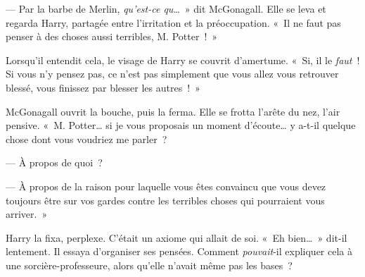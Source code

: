 --- Par la barbe de Merlin, \emph{qu'est-ce qu}…~» dit McGonagall. Elle se leva et regarda Harry, partagée entre l'irritation et la préoccupation.
«~Il ne faut pas penser à des choses aussi terribles, M. Potter~!~»

Lorsqu'il entendit cela, le visage de Harry se couvrit d'amertume.
«~Si, il le \emph{faut}~! Si vous n'y pensez pas, ce n'est pas simplement que vous allez vous retrouver blessé, vous finissez par blesser les autres~!~»

McGonagall ouvrit la bouche, puis la ferma. Elle se frotta l'arête du nez, l'air pensive.
«~M. Potter… si je vous proposais un moment d'écoute… y a-t-il quelque chose dont vous voudriez me parler~?

--- À propos de quoi~?

--- À propos de la raison pour laquelle vous êtes convaincu que vous devez toujours être sur vos gardes contre les terribles choses qui pourraient vous arriver.~»

Harry la fixa, perplexe. C'était un axiome qui allait de soi. «~Eh bien…~» dit-il lentement. Il essaya d'organiser ses pensées. Comment \emph{pouvait}-il expliquer cela à une sorcière-professeure, alors qu'elle n'avait même pas les bases~?

